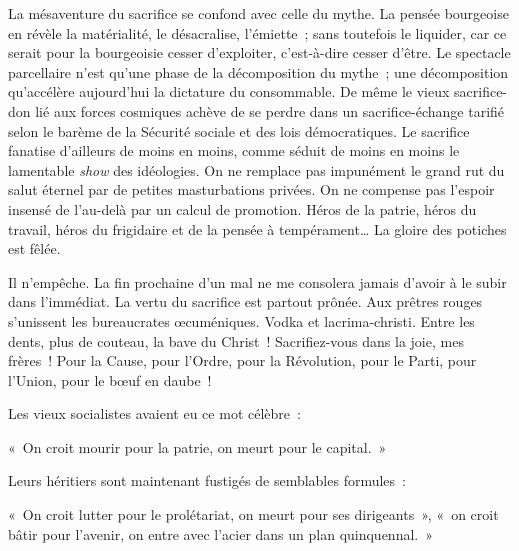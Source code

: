 \documentclass[french,twoside]{book} %
\newenvironment{quoteblock}%
  {\begin{quoting}}
  {\end{quoting}}
\newenvironment{quotebar}{%
    \def\FrameCommand{{\color{rubric!10!}\vrule width 0.5em} \hspace{0.9em}}%
    \def\OuterFrameSep{\itemsep} %
    \MakeFramed {\advance\hsize-\width \FrameRestore}
  }%
  {%
    \endMakeFramed
  }
\renewenvironment{quoteblock}%
  {%
    \savenotes
    \setstretch{0.9}
    \normalfont
    \begin{quotebar}
  }
  {%
    \end{quotebar}
    \spewnotes
  }
\begin{document}
\noindent La mésaventure du sacrifice se confond avec celle du mythe. La pensée bourgeoise en révèle la matérialité, le désacralise, l’émiette ; sans toutefois le liquider, car ce serait pour la bourgeoisie cesser d’exploiter, c’est-à-dire cesser d’être. Le spectacle parcellaire n’est qu’une phase de la décomposition du mythe ; une décomposition qu’accélère aujourd’hui la dictature du consommable. De même le vieux sacrifice-don lié aux forces cosmiques achève de se perdre dans un sacrifice-échange tarifié selon le barème de la Sécurité sociale et des lois démocratiques. Le sacrifice fanatise d’ailleurs de moins en moins, comme séduit de moins en moins le lamentable \emph{show} des idéologies. On ne remplace pas impunément le grand rut du salut éternel par de petites masturbations privées. On ne compense pas l’espoir insensé de l’au-delà par un calcul de promotion. Héros de la patrie, héros du travail, héros du frigidaire et de la pensée à tempérament… La gloire des potiches est fêlée.\par
Il n’empêche. La fin prochaine d’un mal ne me consolera jamais d’avoir à le subir dans l’immédiat. La vertu du sacrifice est partout prônée. Aux prêtres rouges s’unissent les bureaucrates œcuméniques. Vodka et lacrima-christi. Entre les dents, plus de couteau, la bave du Christ ! Sacrifiez-vous dans la joie, mes frères ! Pour la Cause, pour l’Ordre, pour la Révolution, pour le Parti, pour l’Union, pour le bœuf en daube !\par
Les vieux socialistes avaient eu ce mot célèbre :\par

\begin{quoteblock}
\noindent « On croit mourir pour la patrie, on meurt pour le capital. »\end{quoteblock}

\noindent Leurs héritiers sont maintenant fustigés de semblables formules :\par

\begin{quoteblock}
\noindent « On croit lutter pour le prolétariat, on meurt pour ses dirigeants », « on croit bâtir pour l’avenir, on entre avec l’acier dans un plan quinquennal. »\end{quoteblock}
\end{document}
